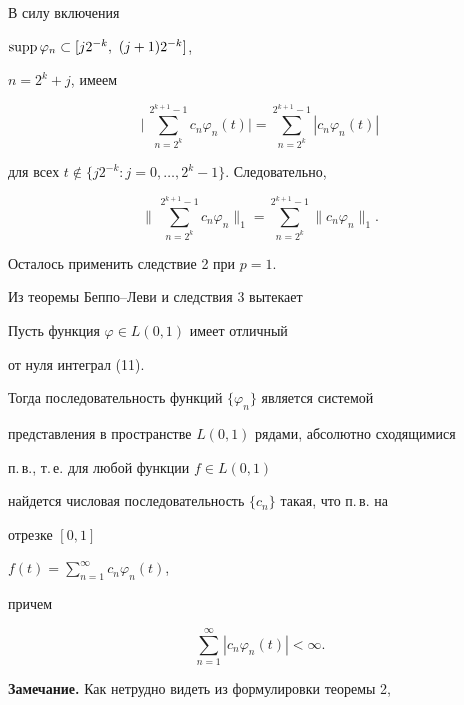 \begin{pf} В силу включения 


$\supp\varphi_n\subset[j2^{-k},\ (j+1)2^{-k}]$, 


$n=2^k+j$, имеем 


$$ 


\bigg|\,\sum^{2^{k+1}-1}_{n=2^k}c_n\varphi_n(t)\bigg|= 


\sum^{2^{k+1}-1}_{n=2^k}|c_n\varphi_n(t)| 


$$ 


для всех $t\notin\{j2^{-k}:j=0,\dotsc,2^k-1\}$. Следовательно, 


$$ 


\bigg\|\,\sum^{2^{k+1}-1}_{n=2^k} 


c_n\varphi_n\bigg\|_1= 


\sum^{2^{k+1}-1}_{n=2^k}\|c_n\varphi_n\|_1. 


$$ 


Осталось применить следствие 2 при $p=1$. 


\end{pf} 


 


Из теоремы Беппо--Леви и следствия 3 вытекает 


 


\begin{cor} Пусть функция $\varphi\in L(0,1)$ имеет отличный 


от нуля интеграл (11). 


Тогда последовательность функций $\{\varphi_n\}$ является системой 


представления в пространстве $L(0,1)$ рядами, абсолютно сходящимися 


п.\,в., т.\,е. для любой функции $f\in L(0,1)$ 


найдется числовая последовательность $\{c_n\}$ такая, что п.\,в. на  


отрезке $[0,1]$\; 


$f(t)=\sum\limits^\infty_{n=1}c_n\varphi_n(t)$, 


причем 


$$ 


\sum^\infty_{n=1}|c_n\varphi_n(t)|<\infty. 


$$ 


\end{cor} 


 


{\bf Замечание.} Как нетрудно видеть из формулировки теоремы 2,  


